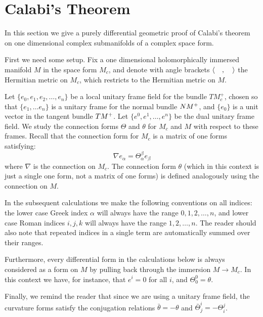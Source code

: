 \section{Calabi's Theorem}

In this section we give a purely differential geometric proof of Calabi's theorem on one dimensional complex submanifolds of a complex space form. 

First we need some setup.  Fix a one dimensional holomorphically immersed manifold $M$ in the space form $M_c$, and denote with angle brackets $\left\langle \quad , \quad \right\rangle$ the Hermitian metric on $M_c$, which restricts to the Hermitian metric on $M$.

Let $\{e_0, e_1, e_2, \ldots , e_n\}$ be a local unitary frame field for the bundle $TM_c^{+}$, chosen so that $\{e_1, \ldots e_n\}$ is a unitary frame for the normal bundle $NM^+$, and $\{ e_0 \}$ is a unit vector in the tangent bundle $TM^{+}$.  Let $\{e^0, e^1, \ldots, e^n\}$ be the dual unitary frame field.  We study the connection forms $\Theta$ and $\theta$ for $M_c$ and $M$ with respect to these frames. Recall that the connection form for $M_c$ is a matrix of one forms satisfying:
%
$$ \nabla e_\alpha = \Theta^{\beta}_{\alpha} e_{\beta} $$
%
where $\nabla$ is the connection on $M_c$.  The connection form $\theta$ (which in this context is just a single one form, not a matrix of one forms) is defined analogously using the connection on $M$.  

\begin{remark} 
%
In the subsequent calculations we make the following conventions on all indices: the lower case Greek index $\alpha$ will always have the range $0,1,2,\ldots,n$, and lower case Roman indices $i,j,k$ will always have the range $1,2,\ldots,n$.  The reader should also note that repeated indices in a single term are automatically summed over their ranges. 

Furthermore, every differential form in the calculations below is always considered as a form on $M$ by pulling back through the immersion $M \rightarrow M_c$.  In this context we have, for instance, that $e^i = 0$ for all $i$, and $\Theta^0_0 = \theta$.  

Finally, we remind the reader that since we are using a unitary frame field, the curvature forms satisfy the conjugation relations $\bar{\theta} = - \theta$ and $\bar{\Theta}^i_j = - \Theta^j_i$.
%
\end{remark}

\bigskip


